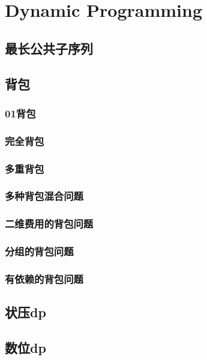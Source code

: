 \documentclass[twocolumn,a4paper]{article}  %
\begin{document}
\section{Dynamic Programming}
\subsection{最长公共子序列}

\subsection{背包}
\subsubsection{01背包}

\subsubsection{完全背包}

\subsubsection{多重背包}

\subsubsection{多种背包混合问题}

\subsubsection{二维费用的背包问题}

\subsubsection{分组的背包问题}

\subsubsection{有依赖的背包问题}

\subsection{状压dp}

\subsection{数位dp}

\end{document}
